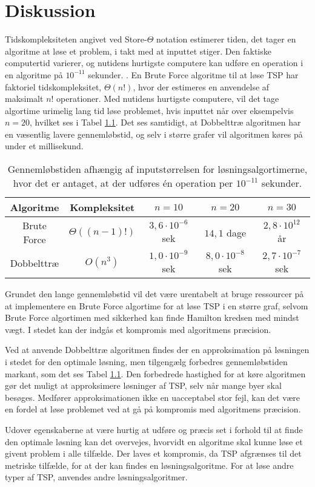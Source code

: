 \chapter{Diskussion}

Tidskompleksiteten angivet ved Store-$\Theta$ notation estimerer tiden, det tager en algoritme at løse et problem, i takt med at inputtet stiger. 
Den faktiske computertid varierer, og nutidens hurtigste computere kan udføre en operation i en algoritme på $10^{-11}$ sekunder. \cite{dmat}.
En Brute Force algoritme til at løse TSP har faktoriel tidskompleksitet, $\Theta(n!)$, hvor der estimeres en anvendelse af maksimalt $n!$ operationer.
Med nutidens hurtigste computere, vil det tage algortime urimelig lang tid løse problemet, hvis inputtet når over eksempelvis $n=20$, hvilket ses i Tabel \ref{tab_algtsp}. Det ses samtidigt, at Dobbelttræ algoritmen har en væsentlig lavere gennemløbstid, og selv i større grafer vil algoritmen køres på under et millisekund. 

\begin{table}[h]
 \centering
  \begin{tabular}{|c|c|c|c|c|}
   \hline
   Algoritme & Kompleksitet & $n=10$ & $n=20$ & $n=30$\\
   \hline
		Brute Force & $\Theta((n-1)!)$ & $3,6 \cdot 10^{-6}$ sek & $14,1$ dage & $2,8 \cdot 10^{12}$ år \\
   \hline
   Dobbelttræ & $O(n^3)$ & $1,0 \cdot 10^{-9}$ sek & $8,0 \cdot 10^{-8}$ sek & $2,7 \cdot 10^{-7}$ sek \\
   \hline
  \end{tabular}
 \caption{Gennemløbstiden afhængig af inputstørrelsen for løsningsalgortimerne, hvor det er antaget, at der udføres én operation per $10^{-11}$ sekunder.} \label{tab_algtsp}
\end{table}

Grundet den lange gennemløbstid vil det være urentabelt at bruge ressourcer på at implementere en Brute Force algortime for at løse TSP i en større graf, selvom Brute Force algortimen med sikkerhed kan finde Hamilton kredsen med mindst vægt. 
I stedet kan der indgås et kompromis med algoritmens præcision. 

Ved at anvende Dobbelttræ algoritmen findes der en approksimation på løsningen i stedet for den optimale løsning, men tilgengælg forbedres gennemløbstiden markant, som det ses Tabel \ref{tab_algtsp}. 
Den forbedrede hastighed for at køre algoritmen gør det muligt at approksimere løsninger af TSP, selv når mange byer skal besøges. 
Medfører approksimationen ikke en uacceptabel stor fejl, kan det være en  fordel at løse problemet ved at gå på kompromis med algoritmens præcision.

Udover egenskaberne at være hurtig at udføre og præcis set i forhold til at finde den optimale løsning kan det overvejes, hvorvidt en algoritme skal kunne løse et givent problem i alle tilfælde. 
Der laves et kompromis, da TSP afgrænses til det metriske tilfælde, for at der kan findes en løsningsalgoritme. For at løse andre typer af TSP, anvendes andre løsningsalgoritmer. 
